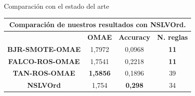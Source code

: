 \documentclass{beamer}
\begin{document}
\begin{frame}{Comparación con el estado del arte}


	\begin{table}[H]
	\centering
	\begin{tabular}{|cccc|}
	\hline
	\multicolumn{4}{|c|}{\textbf{Comparación de nuestros resultados con NSLVOrd.}}    \\ \hline
	\multicolumn{1}{|c|}{\textbf{}}                & \multicolumn{1}{c|}{\textbf{OMAE}}    & \multicolumn{1}{c|}{\textbf{Accuracy}} & \textbf{N. reglas} \\ \hline
	\multicolumn{1}{|c|}{\textbf{BJR-SMOTE-OMAE}} & \multicolumn{1}{c|}{1,7972}          & \multicolumn{1}{c|}{0,0968}           & \textbf{11}        \\ \hline
	\multicolumn{1}{|c|}{\textbf{FALCO-ROS-OMAE}}  & \multicolumn{1}{c|}{1,7541}          & \multicolumn{1}{c|}{0,2218}           & \textbf{11}        \\ \hline
	\multicolumn{1}{|c|}{\textbf{TAN-ROS-OMAE}}    & \multicolumn{1}{c|}{\textbf{1,5856}}          & \multicolumn{1}{c|}{0,1896}            & 39                 \\ \hline
	\multicolumn{1}{|c|}{\textbf{NSLVOrd}}        & \multicolumn{1}{c|}{1,754} & \multicolumn{1}{c|}{\textbf{0,298}}           & 34              \\ \hline
	\end{tabular}%
	\end{table}


\end{frame}
\end{document}
